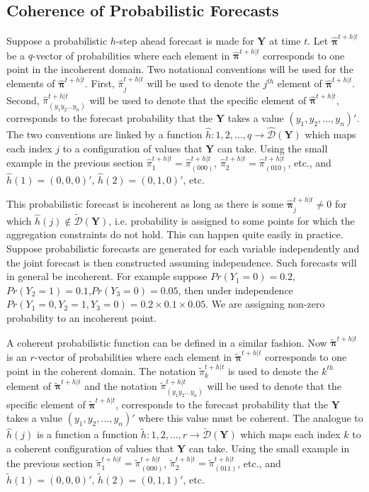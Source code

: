 \documentclass[a4paper,review,12pt,authoryear]{elsarticle}
\newcommand{\bY}{\mathbf{Y}}
\newcommand{\bpi}{\bm{\pi}}
\begin{document}
    \subsection{Coherence of Probabilistic Forecasts}

    Suppose a probabilistic $h$-step ahead forecast is made for $\bY$ at time $t$. 
    Let $\hat{\bpi}^{t+h|t}$ be a $q$-vector of probabilities where each element in $\hat{\bpi}^{t+h|t}$ corresponds to one point in the incoherent domain. 
    Two notational conventions will be used for the elements of $\hat{\bpi}^{t+h|t}$. 
    First, $\hat{\pi}_j^{t+h|t}$ will be used to denote the $j^{th}$ element of $\hat{\bpi}^{t+h|t}$.  
    Second, $\hat{\pi}_{(y_1 y_2 \dots y_n)}^{t+h|t}$ will be used to denote that the specific element of $\hat{\bpi}^{t+h|t}$, corresponds to the forecast probability that the $\bY$ takes a value $(y_1,y_2,\dots,y_n)'$. The two conventions are linked by a function $\hat{h}:{1,2,\dots,q}\rightarrow\hat{\mathcal{D}}(\bY)$ which maps each index $j$ to a configuration of values that $\bY$ can take. 
    Using the small example in the previous section $\hat{\pi}_1^{t+h|t}=\hat{\pi}_{(000)}^{t+h|t}$, $\hat{\pi}_2^{t+h|t}=\hat{\pi}_{(010)}^{t+h|t}$, etc., and $\hat{h}(1)=(0,0,0)'$, $\hat{h}(2)=(0,1,0)'$, etc.
    
    This probabilistic forecast is incoherent as long as there is some $\hat{\bpi}^{t+h|t}_j\neq 0$ for which $\hat{h}(j)\notin\tilde{\mathcal{D}}(\bY)$, i.e. probability is assigned to some points for which the aggregation constraints do not hold. 
    This can happen quite easily in practice. Suppose probabilistic forecasts are generated for each variable independently and the joint forecast is then constructed assuming independence. 
    Such forecasts will in general be incoherent. 
    For example suppose $Pr(Y_1=0)=0.2$,$Pr(Y_2=1)=0.1$,$Pr(Y_3=0)=0.05$, then under independence $Pr(Y_1=0,Y_2=1,Y_3=0)=0.2\times0.1\times0.05$. We are assigning non-zero probability to an incoherent point.
    
    A coherent probabilistic function can be defined in a similar fashion. Now $\tilde{\bpi}^{t+h|t}$ is an $r$-vector of probabilities where each element in $\tilde{\bpi}^{t+h|t}$ corresponds to one point in the coherent domain. The notation $\tilde{\pi}_k^{t+h|t}$ is used to denote the $k^{th}$ element of $\tilde{\bpi}^{t+h|t}$ and the notation $\tilde{\pi}_{(y_1 y_2 \dots y_n)}^{t+h|t}$ will be used to denote that the specific element of $\tilde{\bpi}^{t+h|t}$, corresponds to the forecast probability that the $\bY$ takes a value $(y_1,y_2,\dots,y_n)'$ where this value must be coherent. The analogue to $\hat{h}(j)$ is a function a function $\tilde{h}:{1,2,\dots,r}\rightarrow\tilde{\mathcal{D}}(\bY)$ which maps each index $k$ to a coherent configuration of values that $\bY$ can take. Using the small example in the previous section $\tilde{\pi}_1^{t+h|t}=\tilde{\pi}_{(000)}^{t+h|t}$, $\tilde{\pi}_2^{t+h|t}=\tilde{\pi}_{(011)}^{t+h|t}$, etc., and $\tilde{h}(1)=(0,0,0)'$, $\tilde{h}(2)=(0,1,1)'$, etc.
    
\end{document}
